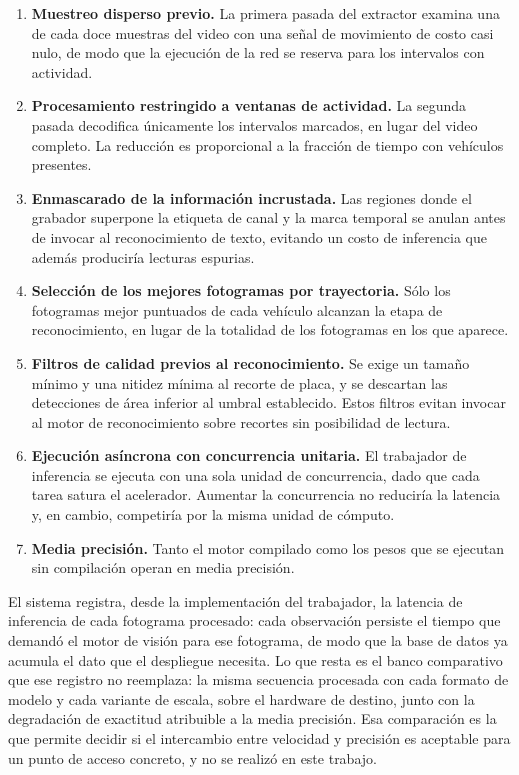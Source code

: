 \begin{enumerate}
    \item \textbf{Muestreo disperso previo.} La primera pasada del extractor
        examina una de cada doce muestras del video con una señal de movimiento
        de costo casi nulo, de modo que la ejecución de la red se reserva para
        los intervalos con actividad.

    \item \textbf{Procesamiento restringido a ventanas de actividad.} La segunda
        pasada decodifica únicamente los intervalos marcados, en lugar del video
        completo. La reducción es proporcional a la fracción de tiempo con
        vehículos presentes.

    \item \textbf{Enmascarado de la información incrustada.} Las regiones donde el
        grabador superpone la etiqueta de canal y la marca temporal se anulan
        antes de invocar al reconocimiento de texto, evitando un costo de
        inferencia que además produciría lecturas espurias.

    \item \textbf{Selección de los mejores fotogramas por trayectoria.} Sólo los
        fotogramas mejor puntuados de cada vehículo alcanzan la etapa de
        reconocimiento, en lugar de la totalidad de los fotogramas en los que
        aparece.

    \item \textbf{Filtros de calidad previos al reconocimiento.} Se exige un
        tamaño mínimo y una nitidez mínima al recorte de placa, y se descartan
        las detecciones de área inferior al umbral establecido. Estos filtros
        evitan invocar al motor de reconocimiento sobre recortes sin posibilidad
        de lectura.

    \item \textbf{Ejecución asíncrona con concurrencia unitaria.} El trabajador de
        inferencia se ejecuta con una sola unidad de concurrencia, dado que cada
        tarea satura el acelerador. Aumentar la concurrencia no reduciría la
        latencia y, en cambio, competiría por la misma unidad de cómputo.

    \item \textbf{Media precisión.} Tanto el motor compilado como los pesos que se
        ejecutan sin compilación operan en media precisión.
\end{enumerate}

El sistema registra, desde la implementación del trabajador, la latencia de
inferencia de cada fotograma procesado: cada observación persiste el tiempo que
demandó el motor de visión para ese fotograma, de modo que la base de datos ya
acumula el dato que el despliegue necesita. Lo que resta es el banco comparativo
que ese registro no reemplaza: la misma secuencia procesada con cada formato de
modelo y cada variante de escala, sobre el hardware de destino, junto con la
degradación de exactitud atribuible a la media precisión. Esa comparación es la
que permite decidir si el intercambio entre velocidad y precisión es aceptable
para un punto de acceso concreto, y no se realizó en este trabajo.
